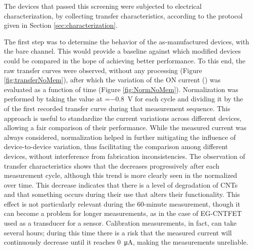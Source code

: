 The devices that passed this screening were subjected to electrical characterization, by collecting transfer characteristics, according to the protocol given in Section \ref{sec:characterization}.

The first step was to determine the behavior of the as-manufactured devices, with the bare channel. This would provide a baseline against which modified devices could be compared in the hope of achieving better performance. To this end, the raw transfer curves were observed, without any processing (Figure \ref{fig:transferNoMem}), after which the variation of the ON current (\ion{}) was evaluated as a function of time (Figure \ref{fig:NormNoMem}). Normalization was performed by taking the \ion{} value at \vgs{}=\SI{-0.8}{\V} for each cycle and dividing it by the \ion{} of the first recorded transfer curve during that measurement sequence. This approach is useful to standardize the current variations across different devices, allowing a fair comparison of their performance. While the measured current was always considered, normalization helped in further mitigating the influence of device-to-device variation, thus facilitating the comparison among different devices, without interference from fabrication inconsistencies.
The observation of transfer characteristics shows that the \ids{} decreases progressively after each measurement cycle, although this trend is more clearly seen in the normalized \ion{} over time. This decrease indicates that there is a level of degradation of CNTs and that something occurs during their use that alters their functionality. This effect is not particularly relevant during the 60-minute measurement, though it can become a problem for longer measurements, as in the case of EG-CNTFET used as a transducer for a sensor. Calibration measurements, in fact, can take several hours; during this time there is a risk that the measured current will continuously decrease until it reaches \SI{0}{\uA}, making the measurements unreliable.

